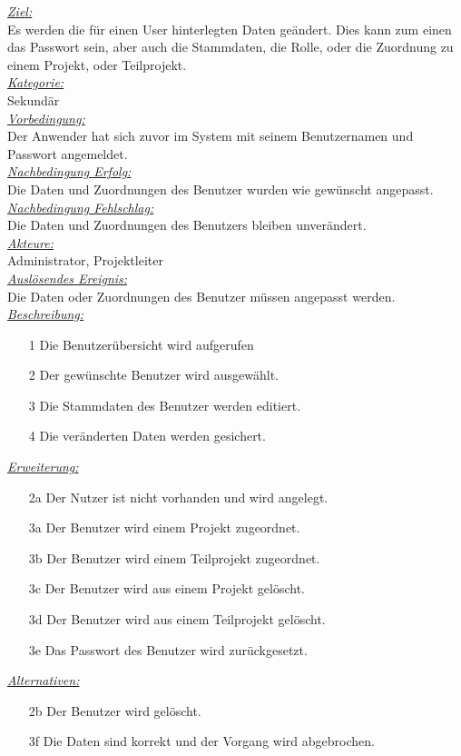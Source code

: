 \underline{\emph{Ziel:}}\\
Es werden die für einen User hinterlegten Daten geändert. Dies kann zum einen das Passwort sein, aber auch die Stammdaten, die Rolle, oder die Zuordnung zu einem Projekt, oder Teilprojekt.\\
\underline{\emph{Kategorie:}} \\
Sekundär\\
\underline{\emph{Vorbedingung:}} \\
Der Anwender hat sich zuvor im System mit seinem Benutzernamen und Passwort angemeldet.\\
\underline{\emph{Nachbedingung Erfolg:}} \\
Die Daten und Zuordnungen des Benutzer wurden wie gewünscht angepasst.\\
\underline{\emph{Nachbedingung Fehlschlag:}} \\
Die Daten und Zuordnungen des Benutzers bleiben unverändert.\\
\underline{\emph{Akteure:}} \\
Administrator, Projektleiter\\
\underline{\emph{Auslösendes Ereignis:}} \\
Die Daten oder Zuordnungen des Benutzer müssen angepasst werden.\\
\underline{\emph{Beschreibung:}}
\begin{itemize}
    \item [1] Die Benutzerübersicht wird aufgerufen
    \item [2] Der gewünschte Benutzer wird ausgewählt.
    \item [3] Die Stammdaten des Benutzer werden editiert.
    \item [4] Die veränderten Daten werden gesichert.
\end{itemize}
\underline{\emph{Erweiterung:}}
\begin{itemize}
    \item [2a] Der Nutzer ist nicht vorhanden und wird angelegt.
    \item [3a] Der Benutzer wird einem Projekt zugeordnet.
    \item [3b] Der Benutzer wird einem Teilprojekt zugeordnet.
    \item [3c] Der Benutzer wird aus einem Projekt gelöscht.
    \item [3d] Der Benutzer wird aus einem Teilprojekt gelöscht.
    \item [3e] Das Passwort des Benutzer wird zurückgesetzt.
\end{itemize}
\underline{\emph{Alternativen:}}
\begin{itemize}
    \item [2b] Der Benutzer wird gelöscht.
    \item [3f] Die Daten sind korrekt und der Vorgang wird abgebrochen.
\end{itemize}


